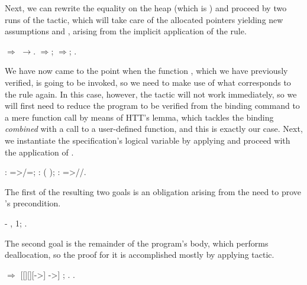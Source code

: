 \coqdocemptyline
Next, we can rewrite the equality on the heap (which is ) and
proceed by two runs of the  tactic, which will take care of the
allocated pointers yielding new assumptions  and , arising
from the implicit application of the  rule.
\begin{coqdoccode}
\coqdocemptyline
\coqdocnoindent
{}\ensuremath{\Rightarrow}\coqdocvar{\_} \ensuremath{\rightarrow}.\coqdoceol
\coqdocnoindent
{}\ensuremath{\Rightarrow}; \ensuremath{\Rightarrow};   .\coqdoceol
\coqdocemptyline
\end{coqdoccode}
We have now came to the point when the function , which we
have previously verified, is going to be invoked, so we need to make
use of what corresponds to the rule  again. In this case,
however, the tactic  will not work immediately, so we will
first need to reduce the program to be verified from the binding
command to a mere function call by means of HTT's  lemma,
which tackles the binding \textit{combined} with a call to a user-defined
function, and this is exactly our case. Next, we instantiate the
 specification's logical variable  by applying 
and proceed with the application of .
\begin{coqdoccode}
\coqdocemptyline
\coqdocnoindent
{}: =>/=; : ( ); : =>//.\coqdoceol
\coqdocemptyline
\end{coqdoccode}


The first of the resulting two goals is an obligation arising from the
need to prove 's precondition.
\begin{coqdoccode}
\coqdocemptyline
\coqdocindent{0.50em}
-   , 1;  .\coqdoceol
\coqdocemptyline
\end{coqdoccode}
The second goal is the remainder of the program's body, which performs
deallocation, so the proof for it is accomplished mostly by applying
 tactic.
\begin{coqdoccode}
\coqdocemptyline
\coqdocnoindent
{} \ensuremath{\Rightarrow}\coqdocvar{\_} \coqdocvar{\_} [[][][->] \coqdocvar{\_} ->] \coqdocvar{\_}; .\coqdoceol
\coqdocnoindent
{}.\coqdoceol
\coqdocemptyline
\end{coqdoccode}


